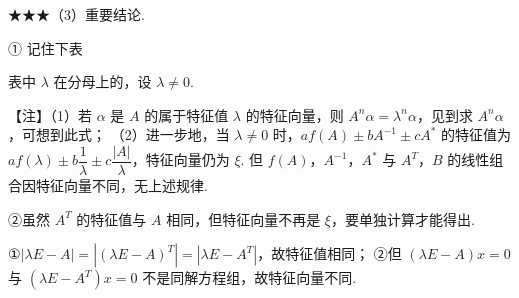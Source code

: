 ★★★（3）重要结论.


\begin{fkey}{① 记住下表}
\end{fkey}

表中 $\lambda$ 在分母上的，设 $\lambda\ne0$.


\begin{fnote}
【注】（1）若 $\alpha$ 是 $A$ 的属于特征值 $\lambda$ 的特征向量，则 $A^{n}\alpha=\lambda^{n}\alpha$，见到求 $A^{n}\alpha$，可想到此式；
（2）进一步地，当 $\lambda\ne0$ 时，$af(A)\pm bA^{-1}\pm cA^{*}$ 的特征值为 $af(\lambda)\pm b\dfrac{1}{\lambda}\pm c\dfrac{|A|}{\lambda}$，特征向量仍为 $\xi$. 但 $f(A)$，$A^{-1}$，$A^{*}$ 与 $A^{T}$，$B$ 的线性组合因特征向量不同，无上述规律.
\end{fnote}

②虽然 $A^{T}$ 的特征值与 $A$ 相同，但特征向量不再是 $\xi$，要单独计算才能得出.

\begin{fnote}
①$|\lambda E-A|=|(\lambda E-A)^{T}|=|\lambda E-A^{T}|$，故特征值相同；
②但 $(\lambda E-A)x=0$ 与 $(\lambda E-A^{T})x=0$ 不是同解方程组，故特征向量不同.
\end{fnote}

